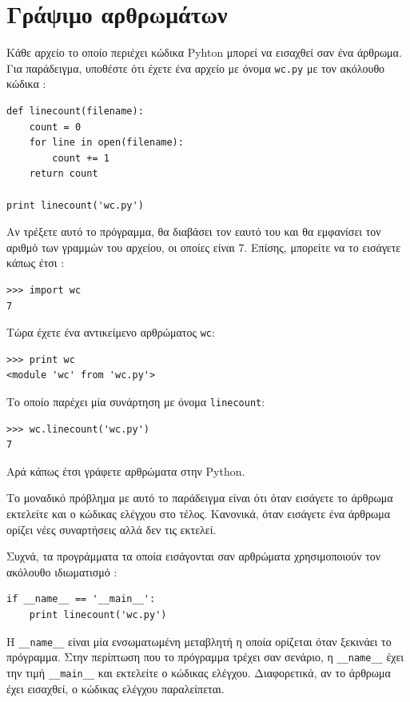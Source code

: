 \documentclass[10pt]{book}
\begin{document}
 
\section{Γράψιμο αρθρωμάτων}
\label{modules}

Κάθε αρχείο το οποίο περιέχει κώδικα  Pyhton  μπορεί να εισαχθεί σαν ένα άρθρωμα. 
Για παράδειγμα, υποθέστε ότι έχετε ένα αρχείο με όνομα  {\tt wc.py}  με τον ακόλουθο κώδικα :

\begin{verbatim}
def linecount(filename):
    count = 0
    for line in open(filename):
        count += 1
    return count

print linecount('wc.py')
\end{verbatim}
%
 Αν τρέξετε αυτό το πρόγραμμα, θα διαβάσει τον εαυτό του και θα εμφανίσει τον αριθμό 
των γραμμών του αρχείου, οι οποίες είναι 7. Επίσης, μπορείτε να το εισάγετε κάπως έτσι :

\begin{verbatim}
>>> import wc
7
\end{verbatim}
%
 Τώρα έχετε ένα αντικείμενο αρθρώματος  {\tt wc}:

\begin{verbatim}
>>> print wc
<module 'wc' from 'wc.py'>
\end{verbatim}
%
 Το οποίο παρέχει μία συνάρτηση με όνομα  \verb"linecount":

\begin{verbatim}
>>> wc.linecount('wc.py')
7
\end{verbatim}
%
 Αρά κάπως έτσι γράφετε αρθρώματα στην  Python.

 Το μοναδικό πρόβλημα με αυτό το παράδειγμα είναι ότι όταν εισάγετε το άρθρωμα εκτελείτε 
και ο κώδικας ελέγχου στο τέλος. Κανονικά, όταν εισάγετε ένα άρθρωμα ορίζει νέες συναρτήσεις αλλά δεν τις εκτελεί.

Συχνά, τα προγράμματα τα οποία εισάγονται σαν αρθρώματα χρησιμοποιούν τον ακόλουθο ιδιωματισμό :

\begin{verbatim}
if __name__ == '__main__':
    print linecount('wc.py')
\end{verbatim}
%
 Η  \verb"__name__"  είναι μία ενσωματωμένη μεταβλητή η οποία ορίζεται όταν 
ξεκινάει το πρόγραμμα. Στην περίπτωση που το πρόγραμμα τρέχει σαν σενάριο, η  \verb"__name__"  έχει την τιμή  \verb"__main__"  και εκτελείτε ο κώδικας ελέγχου. Διαφορετικά, αν το άρθρωμα έχει εισαχθεί, ο κώδικας ελέγχου παραλείπεται.
\end{document}
